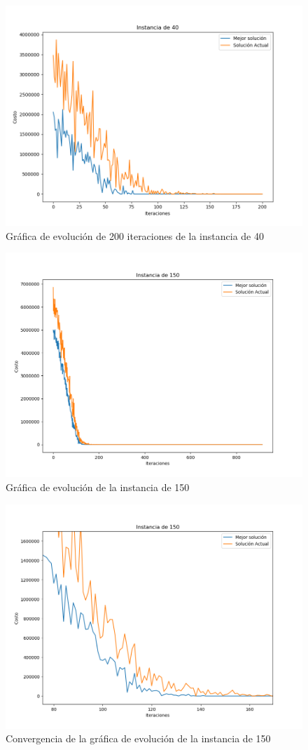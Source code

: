 \documentclass[12pt]{article}
\begin{document}
	\begin{figure}[H]
		\centering
		\caption{Gráfica de evolución de 200 iteraciones de la instancia de 40}
		\includegraphics[scale=0.6,width=12cm]{I40_3.png}
	\end{figure}
	\begin{figure}[H]
		\centering
		\caption{Gráfica de evolución de la instancia de 150}
		\includegraphics[scale=0.6,width=12cm]{I150_1.png}
	\end{figure}
	\begin{figure}[H]
		\centering
		\caption{Convergencia de la gráfica de evolución de la instancia de 150}
		\includegraphics[scale=0.6,width=12cm]{I150_2.png}
	\end{figure}
\end{document}
